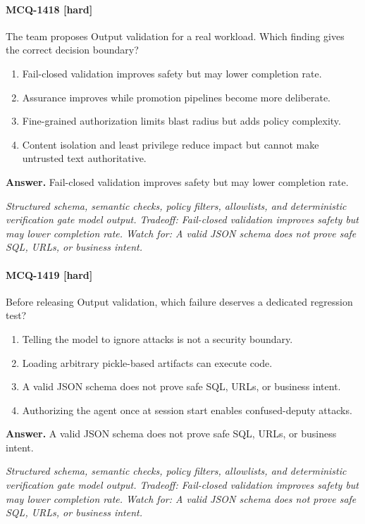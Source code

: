 \paragraph{MCQ-1418 [hard]} The team proposes Output validation for a real workload. Which finding gives the correct decision boundary?
\begin{enumerate}[label=\Alph*.]
\item Fail-closed validation improves safety but may lower completion rate.
\item Assurance improves while promotion pipelines become more deliberate.
\item Fine-grained authorization limits blast radius but adds policy complexity.
\item Content isolation and least privilege reduce impact but cannot make untrusted text authoritative.
\end{enumerate}
\noindent\textbf{Answer.} Fail-closed validation improves safety but may lower completion rate.
\par\textit{Structured schema, semantic checks, policy filters, allowlists, and deterministic verification gate model output. Tradeoff: Fail-closed validation improves safety but may lower completion rate. Watch for: A valid JSON schema does not prove safe SQL, URLs, or business intent.}
\paragraph{MCQ-1419 [hard]} Before releasing Output validation, which failure deserves a dedicated regression test?
\begin{enumerate}[label=\Alph*.]
\item Telling the model to ignore attacks is not a security boundary.
\item Loading arbitrary pickle-based artifacts can execute code.
\item A valid JSON schema does not prove safe SQL, URLs, or business intent.
\item Authorizing the agent once at session start enables confused-deputy attacks.
\end{enumerate}
\noindent\textbf{Answer.} A valid JSON schema does not prove safe SQL, URLs, or business intent.
\par\textit{Structured schema, semantic checks, policy filters, allowlists, and deterministic verification gate model output. Tradeoff: Fail-closed validation improves safety but may lower completion rate. Watch for: A valid JSON schema does not prove safe SQL, URLs, or business intent.}
